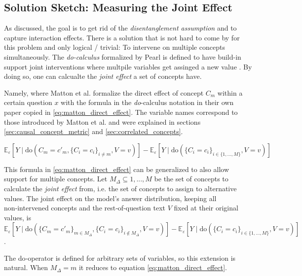 \subsection{Solution Sketch: Measuring the Joint Effect}
\label{sec:joint_effect}
As discussed, the goal is to get rid of the \emph{disentanglement assumption} and to capture interaction effects. There is a solution that is not hard to come by for this problem and only logical / trivial: To intervene on multiple concepts simultaneously. The \emph{do-calculus} formalized by Pearl is defined to have build-in support joint interventions where multpile variables get assinged a new value \cite{shpitserIdentificationJointInterventional2006}. By doing so, one can calcualte the \emph{joint effect} a set of concepts have.

Namely, where Matton et al. formalize the direct effect of concept $C_m$ within a certain question $x$ with the formula in the \emph{do}-calculus notation in their own paper copied in \ref{eq:matton_direct_effect}. The variable names correspond to those introduced by Matton et al. and were explained in sections \ref{sec:causal_concept_metric} and \ref{sec:correlated_concepts}.

\begin{equation}
\label{eq:matton_direct_effect}
\mathbb{E}_{\varepsilon}[Y \mid \text{do}(C_m = c'_m, \{C_i = c_i\}_{i \neq m}, V= v)] - \mathbb{E}_{\varepsilon}[Y \mid \text{do}(\{C_i = c_i\}_{i \in \{1, \dots, M\}},  V = v)]
\end{equation}
 
This formula in \ref{eq:matton_direct_effect} can be generalized to also allow support for multiple concepts. Let $M_{\Delta}\subseteq{1,...,M}$ be the set of concepts to calculate the \emph{joint effect} from, i.e. the set of concepts to assign to alternative values. The joint effect on the model’s answer distribution, keeping all non‑intervened concepts and the rest‑of‑question text $V$ fixed at their original values, is
\begin{equation}
\label{eq:matton_multi_direct_effect}
\mathbb{E}_{\varepsilon}[Y \mid \text{do}(\{C_m = c'_m\}_{m \in M_{\Delta}}, \{C_i = c_i\}_{i \notin M_{\Delta}}, V= v)] - \mathbb{E}_{\varepsilon}[Y \mid \text{do}(\{C_i = c_i\}_{i \in \{1, \dots, M\}},  V = v)]
\end{equation}.

The do‑operator is defined for arbitrary sets of variables, so this extension is natural. When $M_{\Delta}={m}$ it reduces to equation \ref{eq:matton_direct_effect}.

